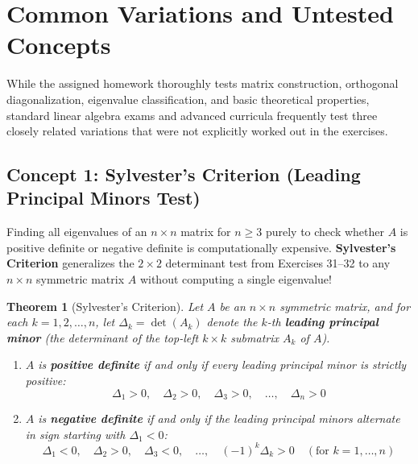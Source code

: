 \documentclass[11pt, letterpaper]{article}
\newtheorem{theorem}{Theorem}[section]
\theoremstyle{definition}
\theoremstyle{remark}
\begin{document}
\newpage
\section{Common Variations and Untested Concepts}

While the assigned homework thoroughly tests matrix construction, orthogonal diagonalization, eigenvalue classification, and basic theoretical properties, standard linear algebra exams and advanced curricula frequently test three closely related variations that were not explicitly worked out in the exercises.

\subsection{Concept 1: Sylvester's Criterion (Leading Principal Minors Test)}
Finding all eigenvalues of an $n \times n$ matrix for $n \ge 3$ purely to check whether $A$ is positive definite or negative definite is computationally expensive. \textbf{Sylvester's Criterion} generalizes the $2 \times 2$ determinant test from Exercises 31--32 to any $n \times n$ symmetric matrix $A$ without computing a single eigenvalue!

\begin{theorem}[Sylvester's Criterion]
Let $A$ be an $n \times n$ symmetric matrix, and for each $k = 1, 2, \dots, n$, let $\Delta_k = \det(A_k)$ denote the $k$-th \textbf{leading principal minor} (the determinant of the top-left $k \times k$ submatrix $A_k$ of $A$).
\begin{enumerate}[label=\alph*.]
    \item $A$ is \textbf{positive definite} if and only if every leading principal minor is strictly positive:
    \[
    \Delta_1 > 0, \quad \Delta_2 > 0, \quad \Delta_3 > 0, \quad \dots, \quad \Delta_n > 0
    \]
    \item $A$ is \textbf{negative definite} if and only if the leading principal minors alternate in sign starting with $\Delta_1 < 0$:
    \[
    \Delta_1 < 0, \quad \Delta_2 > 0, \quad \Delta_3 < 0, \quad \dots, \quad (-1)^k \Delta_k > 0 \quad (\text{for } k = 1, \dots, n)
    \]
\end{enumerate}
\end{theorem}
\end{document}
